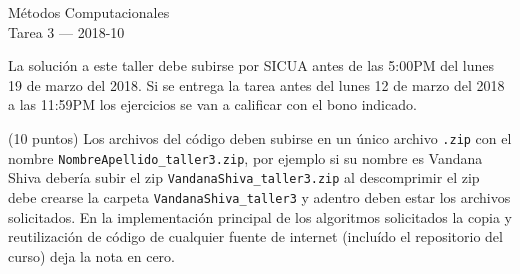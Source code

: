 \documentclass[11pt,letterpaper]{exam}
\begin{document}
\begin{center}
{\Large Métodos Computacionales} \\
Tarea 3 --- 2018-10\\

\end{center}


\vspace{0.3cm}

\noindent
La solución a este taller debe subirse por SICUA antes de las 5:00PM
del lunes 19 de marzo del 2018. 
Si se entrega la tarea antes del lunes 12 de marzo del 2018 a las
11:59PM los ejercicios se van a calificar con el bono indicado. 
\noindent

\vspace{0.3cm}
(10 puntos) Los archivos del c\'odigo  deben subirse en un
\'unico archivo \verb".zip" con el nombre
\verb"NombreApellido_taller3.zip", por ejemplo si su nombre es Vandana
Shiva deber\'ia subir el zip
\verb"VandanaShiva_taller3.zip" al descomprimir el zip debe crearse la
carpeta \verb"VandanaShiva_taller3" y adentro deben estar los archivos
solicitados. 
En la implementaci\'on principal de los algoritmos solicitados la
copia y reutilizaci\'on de c\'odigo de cualquier fuente de internet
(inclu\'ido el repositorio del curso) deja la nota en cero.  
\end{document}
